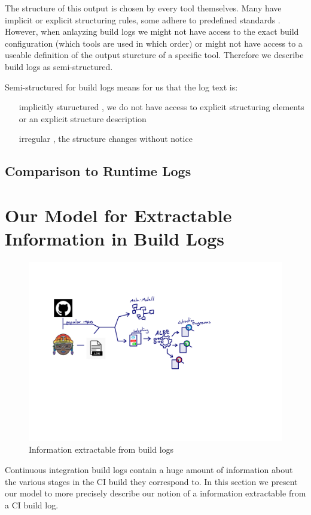 \documentclass[\myrootdir/main.tex]{subfiles}
\begin{document}
The structure of this output is chosen by every tool themselves. Many have implicit or explicit structuring rules, some adhere to predefined standards . However, when anlayzing build logs we might not have access to the exact build configuration (which tools are used in which order) or might not have access to a useable definition of the output sturcture of a specific tool. Therefore we describe build logs as semi-structured.

Semi-structured for build logs means for us that the log text is:
\begin{itemize}
	\item[implicitly stuructured], we do not have access to explicit structuring elements or an explicit structure description
	\item[irregular], the structure changes without notice 
\end{itemize}

\subsection{Comparison to Runtime Logs}

\section{Our Model for Extractable Information in Build Logs}
\begin{figure}[h]
  \centering
\includegraphics[page=2, width=\textwidth, trim={0.5cm 0.5cm 0.5cm 0.5cm}, clip]{img/flow-of-research.pdf}
  \caption{Information extractable from build logs}
  \label{fig:build-log-information-draft}
\end{figure}
Continuous integration build logs contain a huge amount of information about the various stages in the CI build they correspond to. In this section we present our model to more precisely describe our notion of a information extractable from a CI build log.
\end{document}
